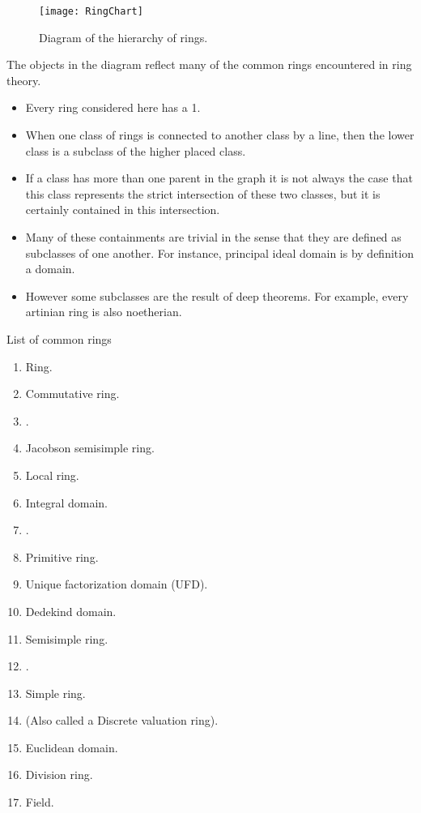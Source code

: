 \documentclass[12pt]{article}
\begin{document}
\begin{figure}
\texttt{[image: RingChart]}
\caption{Diagram of the hierarchy of rings.}
\end{figure}

The objects in the diagram reflect many of the common rings encountered in ring theory.

\begin{itemize}
\item Every ring considered here has a 1.
\item   When one class of rings is connected to another class by a line, then the lower class is a subclass of the higher placed class. 
\item If a class has more than one parent in the graph it is not always the case that this class represents the strict intersection of these two classes, but it is certainly contained in this intersection.
\item Many of these containments are trivial in the sense that they are defined as subclasses of one another.  For instance, principal ideal domain is by definition a domain.  
\item However some subclasses are the result of deep theorems.  For example, every artinian ring is also noetherian.  
\end{itemize}

\Large{List of common rings}

\begin{enumerate}
\item Ring.
\item Commutative ring.
\item {}.
\item Jacobson semisimple ring.
\item Local ring.
\item Integral domain.
\item {}.
\item Primitive ring.
\item Unique factorization domain (UFD).
\item Dedekind domain.
\item Semisimple ring.
\item {}.
\item Simple ring.
\item {} (Also
called a Discrete valuation ring).
\item Euclidean domain.
\item Division ring.
\item Field.
\end{enumerate}
\end{document}
